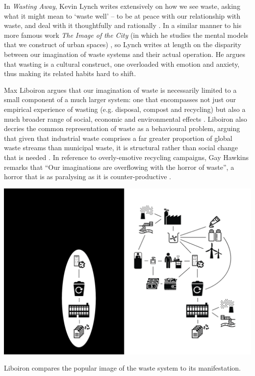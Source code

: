 \documentclass[nofonts,nols,justified,nobib]{tufte-book}
\begin{document}
In \emph{Wasting Away}\cite{lynch_wasting_1990}, Kevin Lynch writes extensively on how we see waste, asking what it might mean to `waste well' -- to be at peace with our relationship with waste, and deal with it thoughtfully and rationally . In a similar manner to his more famous work \emph{The Image of the City} (in which he studies the mental models that we construct of urban spaces) \cite{lynch_image_1960}, so Lynch writes at length on the disparity between our imagination of waste systems and their actual operation. He argues that wasting is a cultural construct, one overloaded with emotion and anxiety, thus making its related habits hard to shift.


Max Liboiron argues that our imagination of waste is necessarily limited to a small component of a much larger system: one that encompasses not just our empirical experience of wasting (e.g. disposal, compost and recycling) but also a much broader range of social, economic and environmental effects \cite{liboiron_why_2014, liboiron_mapping_2014}. Liboiron also decries the common representation of waste as a behavioural problem, arguing that given that industrial waste comprises a far greater proportion of global waste streams than municipal waste, it is structural rather than social change that is needed \cite{liboiron_against_2014}. In reference to overly-emotive recycling campaigns, Gay Hawkins remarks that ``Our imaginations are overflowing with the horror of waste'', a horror that is as paralysing as it is counter-productive \cite{hawkins_ethics_2006}.

\begin{marginfigure}
\includegraphics[width=\textwidth]{img/1/waste-complexity.png}
\caption{Liboiron compares the popular image of the waste system to its manifestation. \cite{liboiron_why_2014}}
\end{marginfigure}
\end{document}
